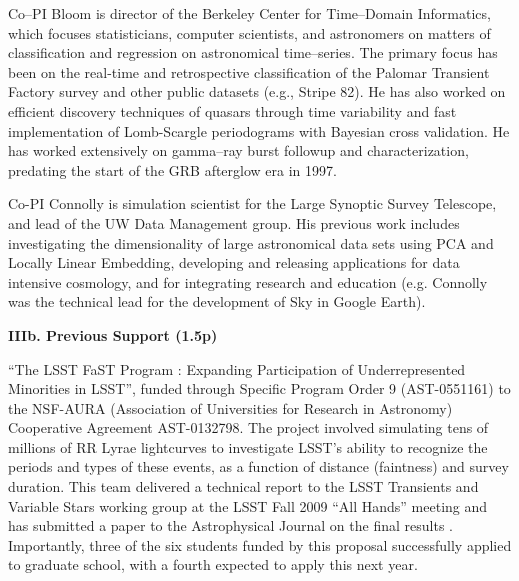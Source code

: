  \smallskip

Co--PI Bloom is director of the Berkeley Center for Time--Domain Informatics,
which focuses statisticians, computer scientists, and astronomers on matters of
classification and regression on astronomical time--series.  The primary focus
has been on the real-time and retrospective classification of the Palomar
Transient Factory survey and other public datasets (e.g., Stripe 82). He has
also worked on efficient discovery techniques of quasars through time
variability and fast implementation of Lomb-Scargle periodograms with Bayesian
cross validation. He has worked extensively on gamma--ray burst followup and
characterization, predating the start of the GRB afterglow era in 1997.

 \smallskip

Co-PI Connolly is simulation scientist for the Large Synoptic Survey Telescope,
and lead of the UW Data Management group.  His previous work includes
investigating the dimensionality of large astronomical data sets using PCA and
Locally Linear Embedding, developing and releasing applications for data
intensive cosmology, and for integrating research and education (e.g. Connolly
was the technical lead for the development of Sky in Google Earth).

\bigskip \centerline{\bf IIIb. Previous Support (1.5p)} \smallskip

 \smallskip

``The LSST FaST Program : Expanding Participation of Underrepresented Minorities
in LSST'', funded through Specific Program Order 9 (AST-0551161) to the NSF-AURA
(Association of Universities for Research in Astronomy) Cooperative Agreement
AST-0132798.  The project involved simulating tens of millions of RR Lyrae
lightcurves to investigate LSST's ability to recognize the periods and types of
these events, as a function of distance (faintness) and survey duration.  This
team delivered a technical report to the LSST Transients and Variable Stars
working group at the LSST Fall 2009 ``All Hands'' meeting and has submitted a
paper to the Astrophysical Journal on the final results \citep{RRLyrae}.
Importantly, three of the six students funded by this proposal successfully
applied to graduate school, with a fourth expected to apply this next year.

 \smallskip

